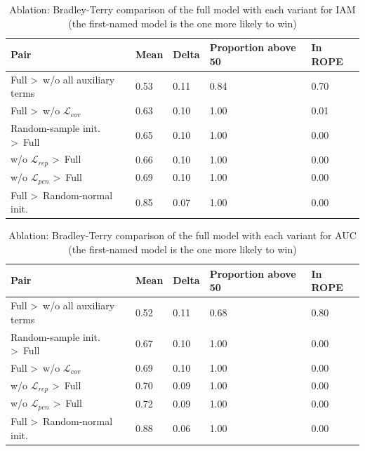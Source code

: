 \begin{table}[H]
\caption{Ablation: Bradley-Terry comparison of the full model with each variant for IAM (the first-named model is the one more likely to win)}
\label{tab:BTablation_IAM}
\centering
\scriptsize
\begin{tabular}{@{}lllll@{}}
\toprule
Pair & Mean & Delta & Proportion above 50 & In ROPE \\
\midrule
Full \textgreater\ w/o all auxiliary terms & 0.53 & 0.11 & 0.84 & 0.70 \\
Full \textgreater\ w/o $\mathcal{L}_{cov}$ & 0.63 & 0.10 & 1.00 & 0.01 \\
Random-sample init. \textgreater\ Full & 0.65 & 0.10 & 1.00 & 0.00 \\
w/o $\mathcal{L}_{rep}$ \textgreater\ Full & 0.66 & 0.10 & 1.00 & 0.00 \\
w/o $\mathcal{L}_{pen}$ \textgreater\ Full & 0.69 & 0.10 & 1.00 & 0.00 \\
Full \textgreater\ Random-normal init. & 0.85 & 0.07 & 1.00 & 0.00 \\
\bottomrule
\end{tabular}%
\end{table}

\begin{table}[H]
\caption{Ablation: Bradley-Terry comparison of the full model with each variant for AUC (the first-named model is the one more likely to win)}
\label{tab:BTablation_AUC}
\centering
\scriptsize
\begin{tabular}{@{}lllll@{}}
\toprule
Pair & Mean & Delta & Proportion above 50 & In ROPE \\
\midrule
Full \textgreater\ w/o all auxiliary terms & 0.52 & 0.11 & 0.68 & 0.80 \\
Random-sample init. \textgreater\ Full & 0.67 & 0.10 & 1.00 & 0.00 \\
Full \textgreater\ w/o $\mathcal{L}_{cov}$ & 0.69 & 0.10 & 1.00 & 0.00 \\
w/o $\mathcal{L}_{rep}$ \textgreater\ Full & 0.70 & 0.09 & 1.00 & 0.00 \\
w/o $\mathcal{L}_{pen}$ \textgreater\ Full & 0.72 & 0.09 & 1.00 & 0.00 \\
Full \textgreater\ Random-normal init. & 0.88 & 0.06 & 1.00 & 0.00 \\
\bottomrule
\end{tabular}%
\end{table}

